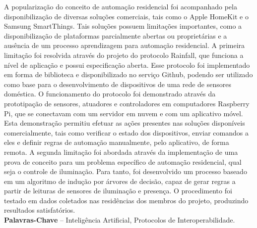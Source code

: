 \documentclass[times, twosideprint]{politex}
\begin{document}
\begin{resumo}
A popularização do conceito de automação residencial foi acompanhado pela disponibilização de diversas soluções comerciais, tais como o Apple HomeKit e o Samsung SmartThings. Tais soluções possuem limitações importantes, como a disponibilização de plataformas parcialmente abertas ou proprietárias e a ausência de um processo aprendizagem para automação residencial. A primeira limitação foi resolvida através do projeto do protocolo Rainfall, que funciona a nível de aplicação e possui especificação aberta. Esse protocolo foi implementado em forma de biblioteca e disponibilizado no serviço Github, podendo ser utilizado como base para o desenvolvimento de dispositivos de uma rede de sensores doméstica. O funcionamento do protocolo foi demonstrado através da prototipação de sensores, atuadores e controladores em computadores Raspberry Pi, que se conectavam com um servidor em nuvem e com um aplicativo móvel. Esta demonstração permitiu efetuar as ações presentes nas soluções disponíveis comercialmente, tais como verificar o estado dos dispositivos, enviar comandos a eles e definir regras de automação manualmente, pelo aplicativo, de forma remota. A segunda limitação foi abordada através da implementação de uma prova de conceito para um problema específico de automação residencial, qual seja o controle de iluminação. Para tanto, foi desenvolvido um processo baseado em um algoritmo de indução por árvores de decisão, capaz de gerar regras a partir de leituras de sensores de iluminação e presença. O procedimento foi testado em dados coletados nas residências dos membros do projeto, produzindo resultados satisfatórios.
%
\\[3\baselineskip]
%
\textbf{Palavras-Chave} -- Inteligência Artificial, Protocolos de Interoperabilidade.
\end{resumo}
\end{document}
